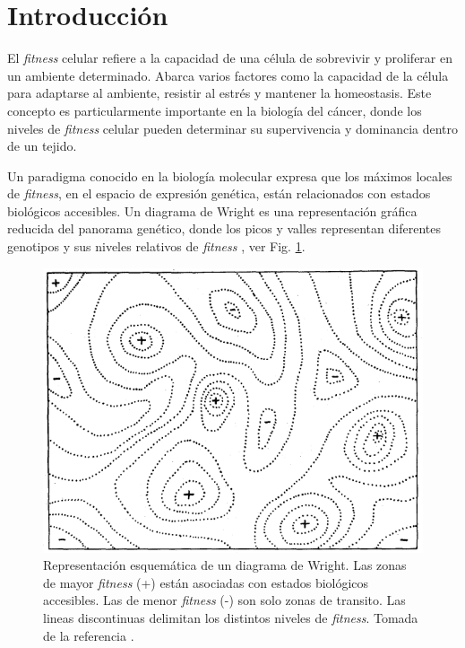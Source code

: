 \chapter*{Introducción} \label{intro}
\onehalfspacing

El \textit{fitness} celular refiere a la capacidad de una célula de sobrevivir y proliferar en un ambiente determinado. Abarca varios factores como la capacidad de la célula para adaptarse al ambiente, resistir al estrés y mantener la homeostasis. Este concepto es particularmente importante en la biología del cáncer, donde los niveles de \textit{fitness} celular pueden determinar su supervivencia y dominancia dentro de un tejido.

Un paradigma conocido en la biología molecular expresa que los máximos locales de \textit{fitness}, en el espacio de expresión genética, están relacionados con estados biológicos accesibles. Un diagrama de Wright es una representación gráfica reducida del panorama genético, donde los picos y valles representan diferentes genotipos y sus niveles relativos de \textit{fitness} \cite{wright1932roles}, ver Fig. \ref{fig:wrightDiagram}. 

\begin{figure}[!htb]
	\centering
	\includegraphics[scale=0.645]{figures/wright_diagram.png}
	\caption{Representación esquemática de un diagrama de Wright. Las zonas de mayor \textit{fitness} (+) están asociadas con estados biológicos accesibles. Las de menor \textit{fitness} (-) son solo zonas de transito. Las lineas discontinuas delimitan los distintos niveles de \textit{fitness}. Tomada de la referencia \cite{wright1932roles}.}
	\label{fig:wrightDiagram}
\end{figure}

